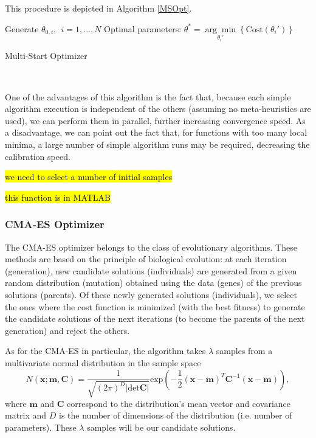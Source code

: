 This procedure is depicted in Algorithm \ref{MSOpt}.

\begin{algorithm}[H]\label{MSOpt}
\DontPrintSemicolon
Generate $\theta_{0,i},\ \ i=1,\ldots,N$
 Optimal parameters: $\theta^{*}=\underset{\theta_i'}{\arg\min}\left\{\mathrm{Cost}(\theta_i')\right\}$\;
 \caption{Multi-Start Optimizer}
\end{algorithm}
\ 

One of the advantages of this algorithm is the fact that, because each simple algorithm execution is independent of the others (assuming no meta-heuristics are used), we can perform them in parallel, further increasing convergence speed.
As a disadvantage, we can point out the fact that, for functions with too many local minima, a large number of simple algorithm runs may be required, decreasing the calibration speed.

\hl{we need to select a number of initial samples}

\hl{this function is in MATLAB}

\subsubsection{CMA-ES Optimizer}
The CMA-ES optimizer belongs to the class of evolutionary algorithms. These methods are based on the principle of biological evolution: at each iteration (generation), new candidate solutions (individuals) are generated from a given random distribution (mutation) obtained using the data (genes) of the previous solutions (parents). Of these newly generated solutions (individuals), we select the ones where the cost function is minimized (with the best fitness) to generate the candidate solutions of the next iterations (to become the parents of the next generation) and reject the others.



As for the CMA-ES in particular, the algorithm takes $\lambda$ samples from a multivariate normal distribution in the sample space
\begin{equation}
N(\mathbf{x;m,C})=\frac{1}{\sqrt{(2\pi)^D|\mathrm{det}\mathbf{C}|}}\mathrm{exp}\left(-\frac{1}{2}(\mathbf{x}-\mathbf{m})^T\mathbf{C}^{-1}(\mathbf{x}-\mathbf{m})\right),
\end{equation}
\noindent where $\mathbf{m}$ and $\mathbf{C}$ correspond to the distribution's mean vector and covariance matrix and $D$ is the number of dimensions of the distribution (i.e. number of parameters).
These $\lambda$ samples will be our candidate solutions.

